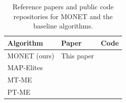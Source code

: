 \begin{table}[h]
\centering
\caption{Reference papers and public code repositories for MONET and the baseline algorithms.}
\label{tab:code-availability}
\small
\setlength{\tabcolsep}{4pt}
\begin{tabular}{@{}lll@{}}
\toprule
\textbf{Algorithm} & \textbf{Paper} & \textbf{Code} \\
\midrule
MONET (ours) & This paper                                                    & \cite{monet_code} \\
MAP-Elites   & \cite{DBLP:journals/corr/MouretC15,MAP_Elites_NaturePaper}    & \cite{pymap_elites_code} \\
MT-ME        & \cite{mouretQualitydiversitymultitaskoptimization2020}        & \cite{pymap_elites_code} \\
PT-ME        & \cite{anneParametricTaskMAPElites2024}                        & \cite{pt_me_code} \\
\bottomrule
\end{tabular}
\end{table}
